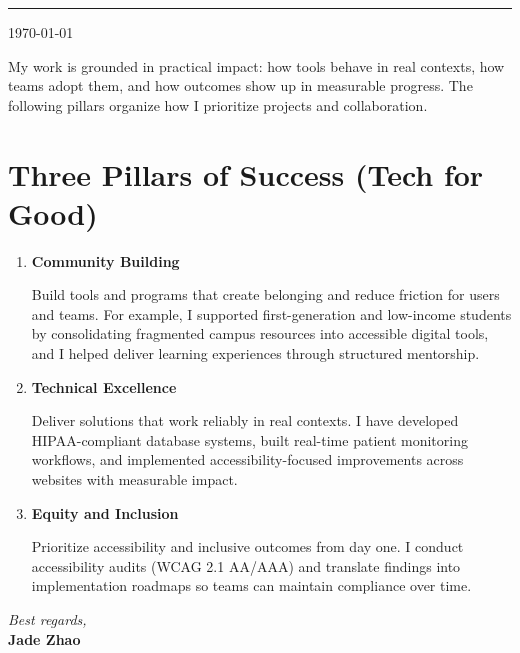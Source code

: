 \documentclass[11pt]{article}
\begin{document}


\vspace{0.5em}
\noindent\rule{\linewidth}{1pt}
\vspace{0.5em}

\noindent\today

\vspace{0.75em}

\noindent
My work is grounded in practical impact: how tools behave in real contexts, how teams adopt them, and how outcomes show up in measurable progress. The following pillars organize how I prioritize projects and collaboration.

\section*{Three Pillars of Success (Tech for Good)}

\begin{enumerate}
    \item \textbf{Community Building}

    Build tools and programs that create belonging and reduce friction for users and teams. For example, I supported first-generation and low-income students by consolidating fragmented campus resources into accessible digital tools, and I helped deliver learning experiences through structured mentorship.

    \item \textbf{Technical Excellence}

    Deliver solutions that work reliably in real contexts. I have developed HIPAA-compliant database systems, built real-time patient monitoring workflows, and implemented accessibility-focused improvements across websites with measurable impact.

    \item \textbf{Equity and Inclusion}

    Prioritize accessibility and inclusive outcomes from day one. I conduct accessibility audits (WCAG 2.1 AA/AAA) and translate findings into implementation roadmaps so teams can maintain compliance over time.
\end{enumerate}

\vspace{1em}
\noindent\textit{Best regards,}\\
\textbf{Jade Zhao}

\end{document}

